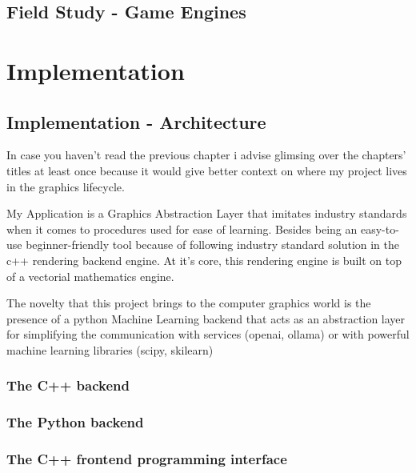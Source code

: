 \chapter*{Field Study - Game Engines}

\part{Implementation}

\chapter*{Implementation - Architecture}

    In case you haven't read the previous chapter i advise glimsing over the chapters' titles at least once because it would give better context on where my project lives in the graphics lifecycle.

    My Application is a Graphics Abstraction Layer that imitates industry standards when it comes to procedures used for ease of learning.
    Besides being an easy-to-use beginner-friendly tool because of following industry standard solution in the c++ rendering backend engine. At it's core, this rendering engine is built on top of a vectorial mathematics engine.

    The novelty that this project brings to the computer graphics world is the presence of a python Machine Learning backend that acts as an abstraction layer for simplifying the communication with services (openai, ollama) or with powerful machine learning libraries (scipy, skilearn) 


    \section*{The C++    backend}
    \section*{The Python backend}

    \section*{The C++    frontend programming interface}
